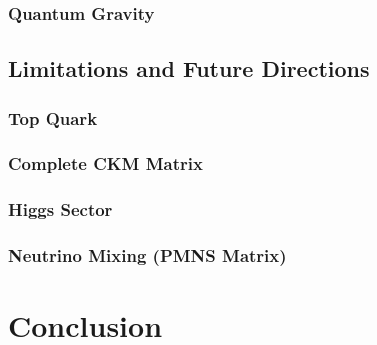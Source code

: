 \documentclass[11pt,a4paper]{article}
\begin{document}
\subsubsection{Quantum Gravity}

\subsection{Limitations and Future Directions}

\subsubsection{Top Quark}

\subsubsection{Complete CKM Matrix}

\subsubsection{Higgs Sector}

\subsubsection{Neutrino Mixing (PMNS Matrix)}

\section{Conclusion}


\end{document}
